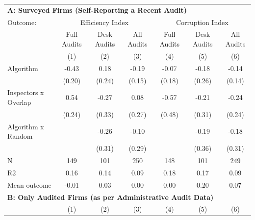 \begin{tabular}{lccc|ccc} \toprule
\multicolumn{7}{l}{\textbf{A: Surveyed Firms (Self-Reporting a Recent Audit)}} \\ \multicolumn{1}{l}{Outcome:} & \multicolumn{3}{c}{Efficiency Index} & \multicolumn{3}{c}{Corruption Index} \\ \multicolumn{1}{l}{} & Full Audits & Desk Audits & All Audits & Full Audits & Desk Audits & All Audits \\ \multicolumn{1}{l}{} & (1) & (2) & (3) & (4) & (5) & (6) \\ \midrule
Algorithm   &       -0.43\sym{**} &        0.18         &       -0.19         &       -0.07         &       -0.18         &       -0.14         \\
            &      (0.20)         &      (0.24)         &      (0.15)         &      (0.18)         &      (0.26)         &      (0.14)         \\
\addlinespace
Inspectors x Overlap&        0.54\sym{**} &       -0.27         &        0.08         &       -0.57         &       -0.21         &       -0.24         \\
            &      (0.24)         &      (0.33)         &      (0.27)         &      (0.48)         &      (0.31)         &      (0.24)         \\
\addlinespace
Algorithm x Random&                     &       -0.26         &       -0.10         &                     &       -0.19         &       -0.18         \\
            &                     &      (0.31)         &      (0.29)         &                     &      (0.36)         &      (0.31)         \\
\midrule
N           &         149         &         101         &         250         &         148         &         101         &         249         \\
R2          &        0.16         &        0.14         &        0.09         &        0.18         &        0.17         &        0.09         \\
Mean outcome&       -0.01         &        0.03         &        0.00         &        0.00         &        0.20         &        0.07         \\

\midrule \multicolumn{7}{l}{\textbf{B: Only Audited Firms (as per Administrative Audit Data)}} \\ \multicolumn{1}{l}{} & (1) & (2) & (3) & (4) & (5) & (6) \\ \midrule


\end{tabular}
